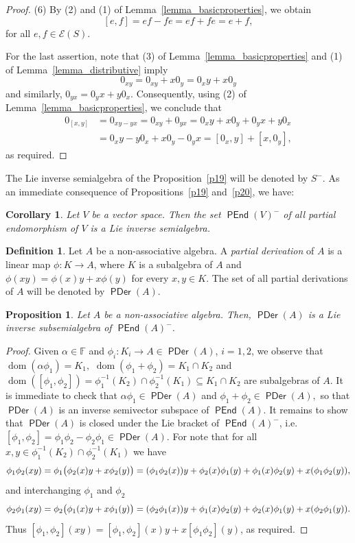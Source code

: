 \documentclass[10pt,a4paper]{amsart}
\newtheorem{cor}[thm]{Corollary}
\newtheorem{prop}[thm]{Proposition}
\theoremstyle{definition}
\newtheorem{defn}[thm]{Definition}
\theoremstyle{remark}
\numberwithin{equation}{section}
\newtheorem*{Theorem A}{\textbf{Theorem A}}
\newtheorem*{Corollary E}{\textbf{Corollary E}}
\newtheorem*{Corollary F}{\textbf{Corollary F}}
\newtheorem*{Theorem B}{\textbf{Theorem B}}
\newtheorem*{Theorem C}{\textbf{Theorem C}}
\newtheorem*{Theorem D}{\textbf{Theorem B}}
\newtheorem*{p a}{\textbf{Proof of  Theorem A}}
\newtheorem*{p b}{\textbf{Proof of Theorem B}}
\newtheorem*{p c}{\textbf{Proof of  Theorem C}}
\newtheorem*{p d}{\textbf{Proof of  Theorem D}}
\newcommand{\E}{\mathcal{E}}
\newcommand{\F}{\mathbb{F}}
\newcommand{\0}{{\vartheta}}
\DeclareMathOperator{\dom}{dom}
\DeclareMathOperator{\pen}{\textsf{PEnd}}
\DeclareMathOperator{\pde}{\textsf{PDer}}
\begin{document}
\begin{proof}
(6)  By (2) and (1)  of Lemma~\ref{lemma_basicproperties}, we obtain
$$[e,f] = ef-fe = ef+fe = e+f, $$
for all $e,f \in \E(S).$

For the last assertion, note that    (3) of  Lemma~\ref{lemma_basicproperties} and (1) of  Lemma~\ref{lemma_distributive}   imply 
$$0_{xy} = 0_{xy} + x 0_y =  0_{x}y + x 0_y $$ and similarly,  $0_{yx} = 0_y x + y 0_x.$ Consequently, using  (2) of  Lemma~\ref{lemma_basicproperties}, we conclude that
\begin{align*} 
0_{[x,y]}&=0_{xy - yx}=   0_{xy}+0_{yx}=  0_{x}y + x 0_y +  0_y x + y 0_x\\
& = 0_{x}y - y 0_x + x 0_y -  0_y x  =
[0_x,y]+[x,0_y],
\end{align*} 
as required.
\end{proof}

The Lie inverse semialgebra of the Proposition~\ref{p19} will be denoted by $S^-$. As an immediate consequence of Propositions~\ref{p19} and~\ref{p20}, we have: 


\begin{cor}
Let $V$ be a vector space. Then the set $\pen(V)^-$ of all partial endomorphism of $V$ is a Lie inverse semialgebra.
\end{cor}


\begin{defn}
Let $A$ be a non-associative algebra. A {\em partial derivation } of $A$ is a linear map $\phi : K \rightarrow A$, where $K$ is a subalgebra of $A$ and 
$\phi (x y)=\phi(x)y+x\phi(y)$
 for every $x, y \in K$. The set of all partial derivations of $A$ will be denoted by $\pde(A)$.
\end{defn}
\begin{prop}
Let $A$ be a non-associative algebra. Then, $\pde(A)$ is a  Lie inverse subsemialgebra of $\pen(A)^-$.
\end{prop}
\begin{proof}
Given $\alpha \in \F$ and $\phi_i: K_i\to A\in \pde(A)$, $i=1,2$, we observe that
$\dom(\alpha \phi_1) = K_1,$  $\dom(\phi_1+\phi_2)=K_1\cap K_2$ and $\dom([\phi_1,\phi_2])=\phi_1^{-1}(K_2)\cap \phi_2^{-1}(K_1) \subseteq K_1 \cap K_2$ are subalgebras of $A$.
It is immediate to check that  $\alpha \phi_1 \in \pde(A)$ and $ \phi_1+\phi_2\in \pde(A),$ so that 
$\pde(A)$ is an inverse semivector subspace of $\pen(A).$ It remains  to show that $\pde(A)$ is closed under  the Lie bracket of $\pen(A)^-$, i.e. 
 $[\phi_1,\phi_2]=\phi_1\phi_2-\phi_2\phi_1\in \pde(A).$  For note that for all $x,y\in \phi_1^{-1}(K_2)\cap \phi_2^{-1}(K_1)$ we have 
$$\phi_1\phi_2(xy)=\phi_1 \big{(} \phi_2(x) y+ x\phi_2(y)\big{)}= (\phi_1\phi_2(x))y+\phi_2(x)\phi_1(y)+\phi_1(x)\phi_2(y)+x(\phi_1\phi_2(y)),$$
and interchanging $\phi_1$ and  $\phi_2$
$$\phi_2\phi_1(xy)=\phi_2 \big{(} \phi_1(x) y+ x\phi_1(y)\big{)}= (\phi_2\phi_1(x))y+\phi_1(x)\phi_2(y)+\phi_2(x)\phi_1(y)+x(\phi_2\phi_1(y)).$$
Thus $[\phi_1,\phi_2](xy)=[\phi_1,\phi_2](x)y+x[\phi_1\phi_2](y)$, as required.
\end{proof}
\end{document}
